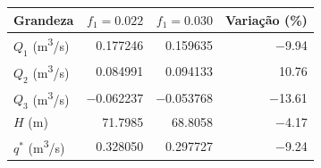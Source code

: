 \begin{tabular}{lrrr}
\toprule
Grandeza & $f_1 = \num{0.022}$ & $f_1 = \num{0.030}$ & Varia\c{c}\~ao (\%) \\
\midrule
$Q_1$ (\si{m^3/s}) & \num{0.177246} & \num{0.159635} & \num{-9.94} \\
$Q_2$ (\si{m^3/s}) & \num{0.084991} & \num{0.094133} & \num{10.76} \\
$Q_3$ (\si{m^3/s}) & \num{-0.062237} & \num{-0.053768} & \num{-13.61} \\
$H$ (\si{m}) & \num{71.7985} & \num{68.8058} & \num{-4.17} \\
\midrule
$q^*$ (\si{m^3/s}) & \num{0.328050} & \num{0.297727} & \num{-9.24} \\
\bottomrule
\end{tabular}
